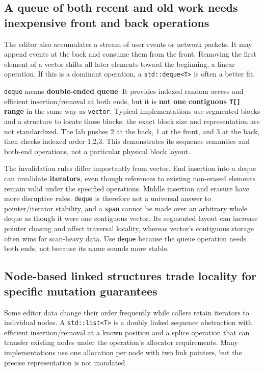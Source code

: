 \subsection{A queue of both recent and old work needs inexpensive front and back operations}\label{01-foundations-i-ch006-a-queue-of-both-recent-and-old-work-needs-inexpensive-front-and-back-operations}

The editor also accumulates a stream of user events or network packets. It may append events at the back and consume them from the front. Removing the first element of a vector shifts all later elements toward the beginning, a linear operation. If this is a dominant operation, a \texttt{std::deque\textless{}T\textgreater{}} is often a better fit.

\texttt{deque} means \textbf{double-ended queue}. It provides indexed random access and efficient insertion/removal at both ends, but it is \textbf{not one contiguous \texttt{T{[}{]}} range} in the same way as \texttt{vector}. Typical implementations use segmented blocks and a structure to locate those blocks; the exact block size and representation are not standardized. The lab pushes 2 at the back, 1 at the front, and 3 at the back, then checks indexed order 1,2,3. This demonstrates its sequence semantics and both-end operations, not a particular physical block layout.

The invalidation rules differ importantly from vector. End insertion into a deque can invalidate \textbf{iterators}, even though references to existing non-erased elements remain valid under the specified operations. Middle insertion and erasure have more disruptive rules. \texttt{deque} is therefore not a universal answer to pointer/iterator stability, and a \texttt{span} cannot be made over an arbitrary whole deque as though it were one contiguous vector. Its segmented layout can increase pointer chasing and affect traversal locality, whereas vector's contiguous storage often wins for scan-heavy data. Use \texttt{deque} because the queue operation needs both ends, not because its name sounds more stable.

\subsection{Node-based linked structures trade locality for specific mutation guarantees}\label{01-foundations-i-ch006-node-based-linked-structures-trade-locality-for-specific-mutation-guarantees}

Some editor data change their order frequently while callers retain iterators to individual nodes. A \texttt{std::list\textless{}T\textgreater{}} is a doubly linked sequence abstraction with efficient insertion/removal at a known position and a splice operation that can transfer existing nodes under the operation's allocator requirements. Many implementations use one allocation per node with two link pointers, but the precise representation is not mandated.

